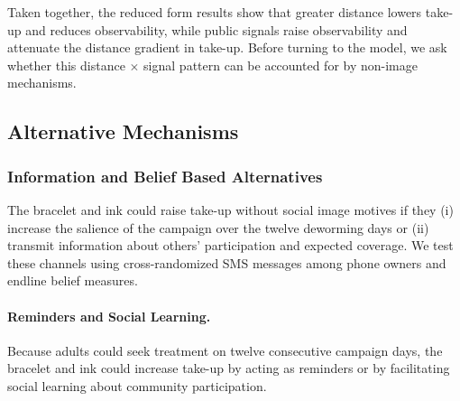 \documentclass[12pt,a4paper]{article}
\begin{document}
Taken together, the reduced form results show that greater distance lowers take-up and reduces observability, while public signals raise observability and attenuate the distance gradient in take-up. Before turning to the model, we ask whether this distance $\times$ signal pattern can be accounted for by non-image mechanisms. 

\subsection{Alternative Mechanisms}

\subsubsection{Information and Belief Based Alternatives}

The bracelet and ink could raise take-up without social image motives if they (i) increase the salience of the campaign over the twelve deworming days or (ii) transmit information about others' participation and expected coverage. We test these channels using cross-randomized SMS messages among phone owners and endline belief measures.

\paragraph{Reminders and Social Learning.} %

Because adults could seek treatment on twelve consecutive campaign days, the bracelet and ink could increase take-up by acting as reminders or by facilitating social learning about community participation. 

\end{document}
